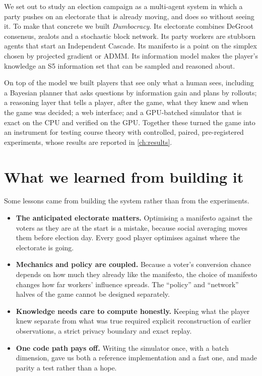 \documentclass[11pt,a4paper,oneside]{report}
\begin{document}
We set out to study an election campaign as a multi-agent system in which a party pushes on an electorate
that is already moving, and does so without seeing it. To make that concrete we built \emph{Dumbocracy}.
Its electorate combines DeGroot consensus, zealots and a stochastic block network. Its party workers are
stubborn agents that start an Independent Cascade. Its manifesto is a point on the simplex chosen by
projected gradient or ADMM. Its information model makes the player's knowledge an S5 information set that
can be sampled and reasoned about.

On top of the model we built players that see only what a human sees, including a Bayesian planner that
asks questions by information gain and plans by rollouts; a reasoning layer that tells a player, after the
game, what they knew and when the game was decided; a web interface; and a GPU-batched simulator that is
exact on the CPU and verified on the GPU. Together these turned the game into an instrument for testing
course theory with controlled, paired, pre-registered experiments, whose results are reported in
\cref{ch:results}.

\section{What we learned from building it}

Some lessons came from building the system rather than from the experiments.
\begin{itemize}
  \item \textbf{The anticipated electorate matters.} Optimising a manifesto against the voters as they are
        at the start is a mistake, because social averaging moves them before election day. Every good
        player optimises against where the electorate is going.
  \item \textbf{Mechanics and policy are coupled.} Because a voter's conversion chance depends on how much
        they already like the manifesto, the choice of manifesto changes how far workers' influence
        spreads. The ``policy'' and ``network'' halves of the game cannot be designed separately.
  \item \textbf{Knowledge needs care to compute honestly.} Keeping what the player knew separate from what
        was true required explicit reconstruction of earlier observations, a strict privacy boundary and
        exact replay.
  \item \textbf{One code path pays off.} Writing the simulator once, with a batch dimension, gave us both a
        reference implementation and a fast one, and made parity a test rather than a hope.
\end{itemize}
\end{document}
